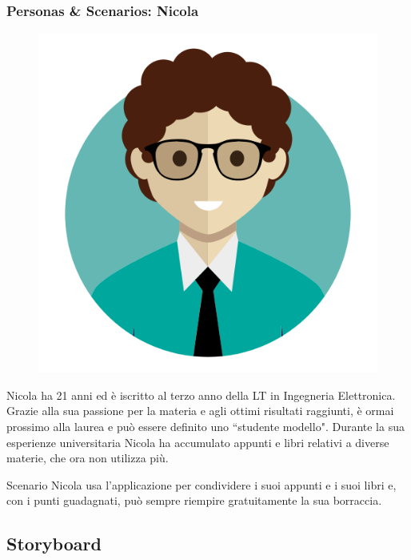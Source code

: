 \documentclass{beamer}
\begin{document}
\begin{frame}
\frametitle{Personas \& Scenarios: Nicola}
\begin{figure}
\includegraphics[width=0.18\linewidth]{images/user_s.png}
\end{figure}
\begin{block}{}
Nicola ha 21 anni ed è iscritto al terzo anno della LT in Ingegneria Elettronica. Grazie alla sua passione per la materia e agli ottimi risultati raggiunti, è ormai prossimo alla laurea e può essere definito uno “studente modello". Durante la sua esperienze universitaria Nicola ha accumulato appunti e libri relativi a diverse materie, che ora non utilizza più.
\end{block}
\begin{block}{Scenario}
Nicola usa l'applicazione per condividere i suoi appunti e i suoi libri e, con i punti guadagnati, può sempre riempire gratuitamente la sua borraccia.
\end{block}
\end{frame}
\subsection{Storyboard}
\end{document}
